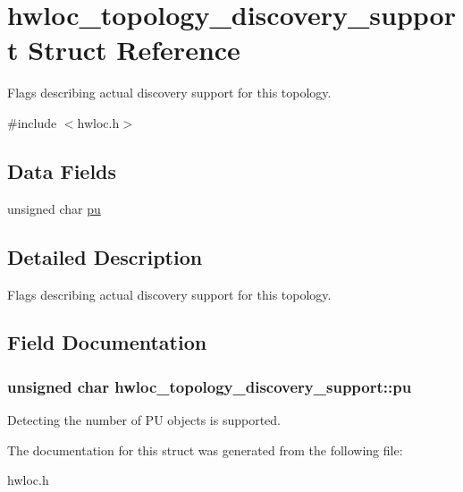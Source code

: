 \hypertarget{a00024}{
\section{hwloc\_\-topology\_\-discovery\_\-support Struct Reference}
\label{a00024}
}


Flags describing actual discovery support for this topology.  




{\ttfamily \#include $<$hwloc.h$>$}

\subsection*{Data Fields}
\begin{DoxyCompactItemize}
\item 
unsigned char \hyperlink{a00024_ad7bb4ecf7a82f5a04fc632e9592ad3ab}{pu}
\end{DoxyCompactItemize}


\subsection{Detailed Description}
Flags describing actual discovery support for this topology. 

\subsection{Field Documentation}
\hypertarget{a00024_ad7bb4ecf7a82f5a04fc632e9592ad3ab}{
\subsubsection[{pu}]{\setlength{\rightskip}{0pt plus 5cm}unsigned char {\bf hwloc\_\-topology\_\-discovery\_\-support::pu}}}
\label{a00024_ad7bb4ecf7a82f5a04fc632e9592ad3ab}


Detecting the number of PU objects is supported. 



The documentation for this struct was generated from the following file:\begin{DoxyCompactItemize}
\item 
hwloc.h\end{DoxyCompactItemize}
